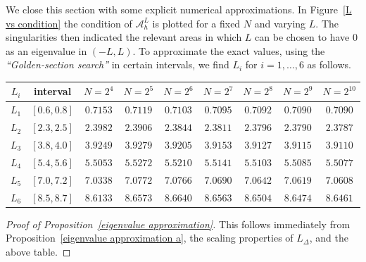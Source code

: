\documentclass[11 pt]{article}
\numberwithin{equation}{section}
\begin{document}
We close this section with some explicit numerical approximations. In Figure~\ref{L vs condition} the condition of $\mathcal{A}^L_h$ is plotted for a fixed $N$ and varying $L$. The singularities then indicated the relevant areas in which $L$ can be chosen to have $0$ as an eigenvalue in $(-L,L)$. To approximate the exact values, using the \textit{``Golden-section search''} in certain intervals, we find $L_i$ for $i=1,\ldots,6$ as follows.

%

\begin{center}
\begin{tabular}{c|c|ccccccc}
$L_i$ & interval & $N=2^4$ & $N=2^5$ & $N=2^6$ & $N=2^7$ & $N=2^8$ & $N=2^9$ & $N=2^{10}$\\
\hline
$L_1$ & $[0.6,0.8]$ & $0.7153$ &$0.7119 $ &$0.7103$ & $0.7095$ & $0.7092$ & $ 0.7090$ &$ 0.7090$\\
$L_2$ & $[2.3,2.5]$ & $2.3982$ &$2.3906$ &$2.3844$ & $2.3811$ &$2.3796$ &$2.3790$&$2.3787$\\
$L_3$ & $[3.8,4.0]$ & $3.9249  $ &$3.9279 $ &$3.9205 $ & $3.9153$ &$3.9127 $ &$3.9115$&$3.9110$\\
$L_4$ & $[5.4,5.6]$ & $5.5053$ &$5.5272 $ &$5.5210$ & $5.5141 $ &$ 5.5103 $ &$5.5085$&$5.5077$\\
$L_5$ & $[7.0,7.2]$ & $7.0338$ &$ 7.0772 $ &$7.0766 $ & $7.0690$ &$ 7.0642  $ &$7.0619$&$7.0608$\\
$L_6$ & $[8.5,8.7]$ & $8.6133$ &$8.6573 $ &$8.6640$ & $8.6563$ &$8.6504$ &$8.6474$&$8.6461$
\end{tabular} 
\end{center}           

\begin{proof}[Proof of Proposition~\ref{eigenvalue approximation}]
This follows immediately from Proposition~\ref{eigenvalue approximation a}, the scaling properties of $L_{\Delta}$, and the above table.
\end{proof}
\end{document}
